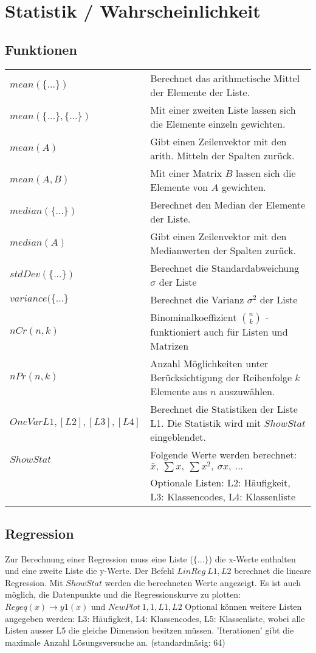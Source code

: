 \section{Statistik / Wahrscheinlichkeit}

\subsection{Funktionen}
\begin{tabular}{|l|l|}
	\hline
	$mean(\{...\})$				& Berechnet das arithmetische Mittel der Elemente der Liste. \\
	$mean(\{...\},\{...\})$		& Mit einer zweiten Liste lassen sich die Elemente einzeln gewichten. \\ \hline
	$mean(A)$					& Gibt einen Zeilenvektor mit den arith. Mitteln der Spalten zurück. \\ 
	$mean(A,B)$					& Mit einer Matrix $B$ lassen sich die Elemente von $A$ gewichten. \\ \hline
	$median(\{...\})$			& Berechnet den Median der Elemente der Liste. \\
	$median(A)$					& Gibt einen Zeilenvektor mit den Medianwerten der Spalten zurück. \\ \hline
	$stdDev(\{...\})$			& Berechnet die Standardabweichung $\sigma$ der Liste \\ \hline
	$variance(\{...\}$			& Berechnet die Varianz $\sigma ^2$ der Liste \\ \hline
	$nCr(n,k)$					& Binominalkoeffizient $\binom{n}{k}$ - funktioniert auch für Listen und Matrizen	\\ \hline
	$nPr(n,k)$					& Anzahl Möglichkeiten unter Berücksichtigung der Reihenfolge $k$ Elemente aus $n$ auszuwählen. \\ \hline
	$OneVar L1,[L2],[L3],[L4]$	& Berechnet die Statistiken der Liste L1. Die Statistik wird mit $ShowStat$ eingeblendet. \\
	$ShowStat$					& Folgende Werte werden berechnet: $ \bar x, \: \sum x, \: \sum x^2, \: \sigma x, \: ...$ \\
								& Optionale Listen: L2: Häufigkeit, L3: Klassencodes, L4: Klassenliste \\ \hline
\end{tabular}

\subsection{Regression}
Zur Berechnung einer Regression muss eine Liste ($\{...\}$) die x-Werte enthalten 
und eine zweite Liste die y-Werte. Der Befehl $LinReg \: L1,L2$ berechnet die lineare 
Regression. Mit $ShowStat$ werden die berechneten Werte angezeigt. 
Es ist auch möglich, die Datenpunkte und die Regressionskurve zu plotten: 
$Regeq(x) \to y1(x)$ und $NewPlot \: 1,1,L1,L2$ Optional können weitere Listen 
angegeben werden: L3: Häufigkeit, L4: Klassencodes,  L5: Klassenliste, wobei alle Listen ausser 
L5 die gleiche Dimension besitzen müssen. 'Iterationen' gibt die maximale Anzahl Lösungsversuche an. 
(standardmäsig: 64)\\

